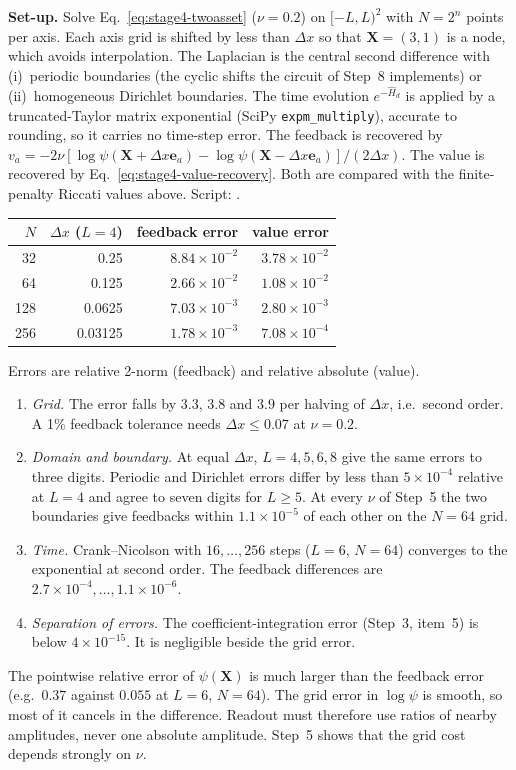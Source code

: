 \documentclass[11pt,a4paper]{article}
\begin{document}
\textbf{Set-up.} Solve Eq.~\eqref{eq:stage4-twoasset} ($\nu=0.2$) on
$[-L,L)^2$ with $N=2^n$ points per axis. Each axis grid is shifted by
less than $\Delta x$ so that $\mathbf X=(3,1)$ is a node, which avoids
interpolation. The Laplacian is the central second difference with
(i)~periodic boundaries (the cyclic shifts the circuit of Step~8
implements) or (ii)~homogeneous Dirichlet boundaries. The time evolution
$e^{-\hat H_d}$ is applied by a truncated-Taylor matrix exponential
(SciPy \texttt{expm\_multiply}), accurate to rounding, so it carries no
time-step error. The feedback is recovered by
$v_a=-2\nu[\log\psi(\mathbf X+\Delta x\mathbf e_a)
-\log\psi(\mathbf X-\Delta x\mathbf e_a)]/(2\Delta x)$. The value is
recovered by Eq.~\eqref{eq:stage4-value-recovery}. Both are compared with
the finite-penalty Riccati values above. Script:
.
\begin{center}
\begin{tabular}{@{}rrrr@{}}
\toprule
$N$ & $\Delta x$ ($L=4$) & feedback error & value error\\
\midrule
32 & 0.25 & $8.84\times10^{-2}$ & $3.78\times10^{-2}$\\
64 & 0.125 & $2.66\times10^{-2}$ & $1.08\times10^{-2}$\\
128 & 0.0625 & $7.03\times10^{-3}$ & $2.80\times10^{-3}$\\
256 & 0.03125 & $1.78\times10^{-3}$ & $7.08\times10^{-4}$\\
\bottomrule
\end{tabular}
\end{center}
Errors are relative 2-norm (feedback) and relative absolute (value).
\begin{enumerate}
\item \emph{Grid.} The error falls by $3.3$, $3.8$ and $3.9$ per halving
of $\Delta x$, i.e.\ second order. A 1\% feedback tolerance needs
$\Delta x\le0.07$ at $\nu=0.2$.
\item \emph{Domain and boundary.} At equal $\Delta x$, $L=4,5,6,8$ give
the same errors to three digits. Periodic and Dirichlet errors differ by
less than $5\times10^{-4}$ relative at $L=4$ and agree to seven digits for
$L\ge5$. At every $\nu$ of Step~5 the two boundaries give feedbacks within
$1.1\times10^{-5}$ of each other on the $N=64$ grid.
\item \emph{Time.} Crank--Nicolson with $16,\dots,256$ steps ($L=6$,
$N=64$) converges to the exponential at second order. The feedback
differences are $2.7\times10^{-4},\dots,1.1\times10^{-6}$.
\item \emph{Separation of errors.} The coefficient-integration error
(Step~3, item~5) is below $4\times10^{-15}$. It is negligible beside the
grid error.
\end{enumerate}
The pointwise relative error of $\psi(\mathbf X)$ is much larger than the
feedback error (e.g.\ $0.37$ against $0.055$ at $L=6$, $N=64$). The grid
error in $\log\psi$ is smooth, so most of it cancels in the difference.
Readout must therefore use ratios of nearby amplitudes, never one
absolute amplitude. Step~5 shows that the grid cost depends strongly
on $\nu$.
\end{document}
